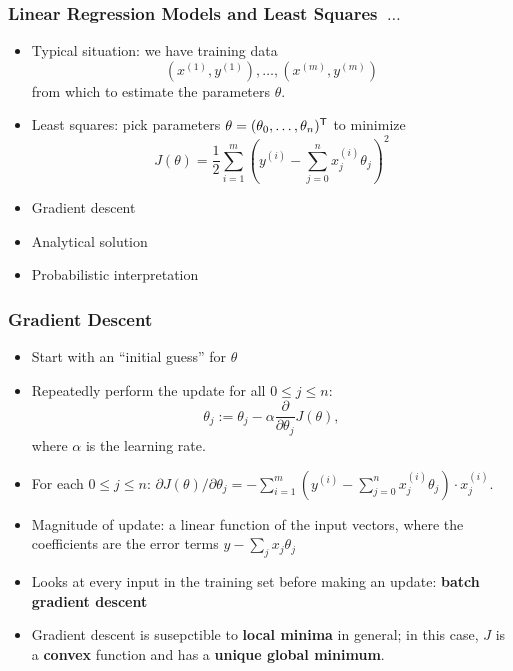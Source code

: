 \documentclass[xcolor=table]{beamer}
\newcommand{\trans}[1]{\ensuremath{#1}^{\scriptsize{\textsf{T}}}}
\begin{document}
\begin{frame}[t]
\frametitle{Linear Regression Models and Least Squares~$\ldots$}
\begin{itemize}
    \item Typical situation: we have training data 
    \[(x^{(1)}, y^{(1)}), \ldots, (x^{(m)}, y^{(m)})\] 
    from which to estimate the parameters $\theta$.
    
    \item Least squares: pick parameters $\theta = \trans{(\theta_0, \ldots, \theta_n)}$ to minimize 
    \[J(\theta) = 
    \frac{1}{2} \sum_{i = 1}^{m} \left (y^{(i)} - \sum_{j = 0}^{n} x^{(i)}_j \theta_j \right )^2\]   
\end{itemize}

\pause

\begin{itemize}
    \item Gradient descent
    \item Analytical solution
    \item Probabilistic interpretation
\end{itemize}
\end{frame}

\begin{frame}[t]
\frametitle{Gradient Descent}
\begin{itemize}
    \item Start with an ``initial guess'' for $\theta$

    \pause

    \item Repeatedly perform the update for all $0 \leq j \leq n$:
    \[
        \theta_j := \theta_j - \alpha \frac{\partial}{\partial \theta_j} J(\theta),
    \]
    where $\alpha$ is the learning rate.

    \pause 

    \item For each $0 \leq j \leq n$:
    $
        \partial J(\theta)/ \partial \theta_j = - \sum_{i = 1}^m 
        \left ( y^{(i)} - \sum_{j = 0}^n x_j^{(i)} \theta_j \right ) \cdot x_j^{(i)}.
    $
    
    \pause

    \item Magnitude of update: a linear function of the input vectors, where the
    coefficients are the error terms $y - \sum_j x_j \theta_j$

    \pause

    \item Looks at every input in the training set before making an update: \pause
    \textbf{batch gradient descent}
    
    \pause

    \item Gradient descent is susepctible to \textbf{local minima} in general; in
    this case, $J$ is a \textbf{convex} function and has a \textbf{unique global
    minimum}.  
\end{itemize}
\end{frame}
\end{document}
